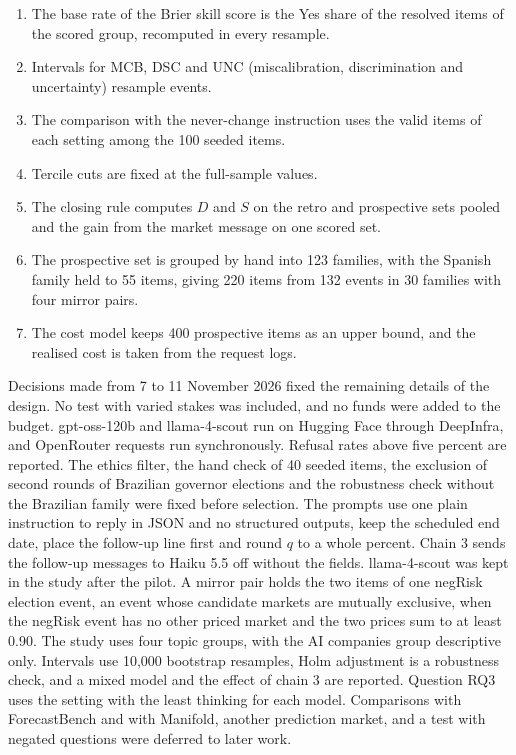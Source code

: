 \documentclass[11pt]{article}
\begin{document}
\begin{enumerate}
\item The base rate of the Brier skill score is the Yes share of the resolved items of the scored group, recomputed in every resample.
\item Intervals for MCB, DSC and UNC (miscalibration, discrimination and uncertainty) resample events.
\item The comparison with the never-change instruction uses the valid items of each setting among the 100 seeded items.
\item Tercile cuts are fixed at the full-sample values.
\item The closing rule computes $D$ and $S$ on the retro and prospective sets pooled and the gain from the market message on one scored set.
\item The prospective set is grouped by hand into 123 families, with the Spanish family held to 55 items, giving 220 items from 132 events in 30 families with four mirror pairs.
\item The cost model keeps 400 prospective items as an upper bound, and the realised cost is taken from the request logs.
\end{enumerate}

Decisions made from 7 to 11 November 2026 fixed the remaining details of the design. No test with varied stakes was included, and no funds were added to the budget. gpt-oss-120b and llama-4-scout run on Hugging Face through DeepInfra, and OpenRouter requests run synchronously. Refusal rates above five percent are reported. The ethics filter, the hand check of 40 seeded items, the exclusion of second rounds of Brazilian governor elections and the robustness check without the Brazilian family were fixed before selection. The prompts use one plain instruction to reply in JSON and no structured outputs, keep the scheduled end date, place the follow-up line first and round $q$ to a whole percent. Chain 3 sends the follow-up messages to Haiku 5.5 off without the fields. llama-4-scout was kept in the study after the pilot. A mirror pair holds the two items of one negRisk election event, an event whose candidate markets are mutually exclusive, when the negRisk event has no other priced market and the two prices sum to at least 0.90. The study uses four topic groups, with the AI companies group descriptive only. Intervals use 10,000 bootstrap resamples, Holm adjustment is a robustness check, and a mixed model and the effect of chain 3 are reported. Question RQ3 uses the setting with the least thinking for each model. Comparisons with ForecastBench and with Manifold, another prediction market, and a test with negated questions were deferred to later work.
\end{document}

